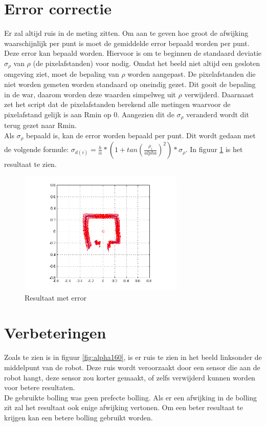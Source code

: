 \documentclass[a4paper]{article}
\begin{document}
\section{Error correctie}
Er zal altijd ruis in de meting zitten. Om aan te geven hoe groot de afwijking waarschijnlijk per punt is moet de gemiddelde error bepaald worden per punt. Deze error kan bepaald worden. Hiervoor is om te beginnen de standaard deviatie $\sigma_\rho$ van $\rho$ (de pixelafstanden) voor nodig. Omdat het beeld niet altijd een gesloten omgeving ziet, moet de bepaling van $\rho$ worden aangepast. De pixelafstanden die niet worden gemeten worden standaard op oneindig gezet. Dit gooit de bepaling in de war, daarom worden deze waarden simpelweg uit $\rho$ verwijderd. Daarnaast zet het script dat de pixelafstanden berekend alle metingen waarvoor de pixelafstand gelijk is aan Rmin op 0. Aangezien dit de $\sigma_\rho$ veranderd wordt dit terug gezet naar Rmin. \\
Als $\sigma_\rho$ bepaald is, kan de error worden bepaald per punt. Dit wordt gedaan met de volgende formule: $\sigma_{d(i)}=\frac{h}{\alpha}*(1+ tan(\frac{\rho_i}{alpha})^2)*\sigma_\rho$. In figuur \ref{fig:error} is het resultaat te zien.
\begin{figure}[h]
	\centering
	\includegraphics[width=0.7\textwidth]{img/error.png}
	\caption{Resultaat met error}
	\label{fig:error}
\end{figure}
\section{Verbeteringen}
Zoals te zien is in figuur \ref{fig:alpha160}, is er ruis te zien in het beeld linksonder de middelpunt van de robot. Deze ruis wordt veroorzaakt door een sensor die aan de robot hangt, deze sensor zou korter gemaakt, of zelfs verwijderd kunnen worden voor betere resultaten. \\
De gebruikte bolling was geen prefecte bolling. Als er een afwijking in de bolling zit zal het resultaat ook enige afwijking vertonen. Om een beter resultaat te krijgen kan een betere bolling gebruikt worden.
\end{document}
